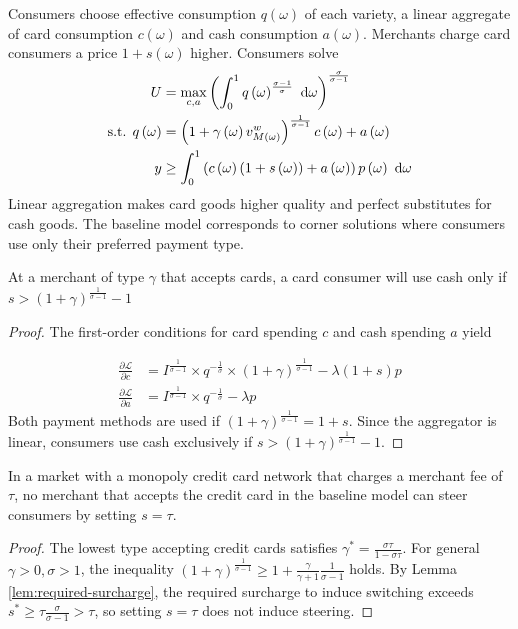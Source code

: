 \documentclass[main.tex]{subfiles}
\begin{document}
Consumers choose effective consumption $q\left(\omega\right)$ of each variety, a linear aggregate of card consumption $c\left(\omega\right)$ and cash consumption $a\left(\omega\right)$.
Merchants charge card consumers a price $1+s\left(\omega\right)$ higher.
Consumers solve
\begin{align}
U & =\max_{c,a}\left(\int_{0}^{1}q\left(\omega\right)^{\frac{\sigma-1}{\sigma}}\mbox{ d}\omega\right)^{\frac{\sigma}{\sigma-1}}\label{eq:ces-microfoundation-pay-choice}\\
\text{s.t. }q\left(\omega\right) & =\left(1+\gamma\left(\omega\right)v_{M\left(\omega\right)}^{w}\right)^{\frac{1}{\sigma-1}}c\left(\omega\right)+a\left(\omega\right)\\
y & \geq\int_{0}^{1}\left(c\left(\omega\right)\left(1+s\left(\omega\right)\right)+a\left(\omega\right)\right)p\left(\omega\right) \mbox{ d}\omega
\end{align}
Linear aggregation makes card goods higher quality and perfect substitutes for cash goods.
The baseline model corresponds to corner solutions where consumers use only their preferred payment type.

\begin{lem}
At a merchant of type $\gamma$ that accepts cards, a card consumer will use cash only if $s>\left(1+\gamma\right)^{\frac{1}{\sigma-1}}-1$\label{lem:required-surcharge}

\end{lem}
\begin{proof}
The first-order conditions for card spending $c$ and cash spending $a$ yield

\begin{align*}
\frac{\partial\mathcal{L}}{\partial c} & =I^{\frac{1}{\sigma-1}}\times q^{-\frac{1}{\sigma}}\times\left(1+\gamma\right)^{\frac{1}{\sigma-1}}-\lambda\left(1+s\right)p\\
\frac{\partial\mathcal{L}}{\partial a} & =I^{\frac{1}{\sigma-1}}\times q^{-\frac{1}{\sigma}}-\lambda p
\end{align*}
Both payment methods are used if $\left(1+\gamma\right)^{\frac{1}{\sigma-1}}=1+s$.
Since the aggregator is linear, consumers use cash exclusively if $s>\left(1+\gamma\right)^{\frac{1}{\sigma-1}}-1$.

\end{proof}

\begin{theorem}
In a market with a monopoly credit card network that charges a merchant fee of $\tau$, no merchant that accepts the credit card in the baseline model can steer consumers by setting $s=\tau$.

\end{theorem}
\begin{proof}
The lowest type accepting credit cards satisfies $\gamma^{*}=\frac{\sigma\tau}{1-\sigma\tau}$.
For general $\gamma>0,\sigma>1$, the inequality $\left(1+\gamma\right)^{\frac{1}{\sigma-1}}\geq1+\frac{\gamma}{\gamma+1}\frac{1}{\sigma-1}$ holds.
By Lemma \ref{lem:required-surcharge}, the required surcharge to induce switching exceeds $s^{*}\geq\tau\frac{\sigma}{\sigma-1}>\tau$, so setting $s=\tau$ does not induce steering.

\end{proof}
\end{document}
